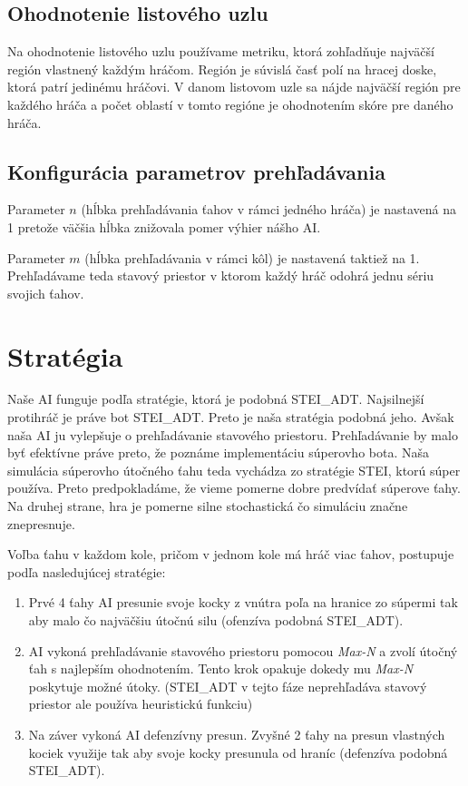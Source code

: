 \documentclass[a4paper, 11pt]{article}
\begin{document}
\subsection{Ohodnotenie listového uzlu}
Na ohodnotenie listového uzlu používame metriku, ktorá zohľadňuje najväčší región vlastnený každým hráčom. Región je súvislá časť polí na hracej doske, ktorá patrí jedinému hráčovi. V danom listovom uzle sa nájde najväčší región pre každého hráča a počet oblastí v tomto regióne je ohodnotením skóre pre daného hráča.

\subsection{Konfigurácia parametrov prehľadávania}
Parameter $n$ (hĺbka prehľadávania ťahov v rámci jedného hráča) je nastavená na 1 pretože väčšia hĺbka znižovala pomer výhier nášho AI. 

Parameter $m$ (hĺbka prehľadávania v rámci kôl) je nastavená taktiež na 1. Prehľadávame teda stavový priestor v ktorom každý hráč odohrá jednu sériu svojich ťahov.

\section{Stratégia}
Naše AI funguje podľa stratégie, ktorá je podobná STEI\_ADT. Najsilnejší protihráč je práve bot STEI\_ADT. Preto je naša stratégia podobná jeho. Avšak naša AI ju vylepšuje o prehľadávanie stavového priestoru. Prehľadávanie by malo byť efektívne práve preto, že poznáme implementáciu súperovho bota. Naša simulácia súperovho útočného ťahu teda vychádza zo stratégie STEI, ktorú súper používa. Preto predpokladáme, že vieme pomerne dobre predvídať súperove ťahy. Na druhej strane, hra je pomerne silne stochastická čo simuláciu značne znepresnuje.

Voľba ťahu v každom kole, pričom v jednom kole má hráč viac ťahov, postupuje podľa nasledujúcej stratégie:
\begin{enumerate}
	\item Prvé 4 ťahy AI presunie svoje kocky z vnútra poľa na hranice zo súpermi tak aby malo čo najväčšiu útočnú silu (ofenzíva podobná STEI\_ADT).
	\item AI vykoná prehľadávanie stavového priestoru pomocou \textit{Max-N} a zvolí útočný ťah s najlepším ohodnotením. Tento krok opakuje dokedy mu \textit{Max-N} poskytuje možné útoky. (STEI\_ADT v tejto fáze neprehľadáva stavový priestor ale používa heuristickú funkciu)
	\item Na záver vykoná AI defenzívny presun. Zvyšné 2 ťahy na presun vlastných kociek využije tak aby svoje kocky presunula od hraníc (defenzíva podobná STEI\_ADT).
\end{enumerate}
\end{document}
